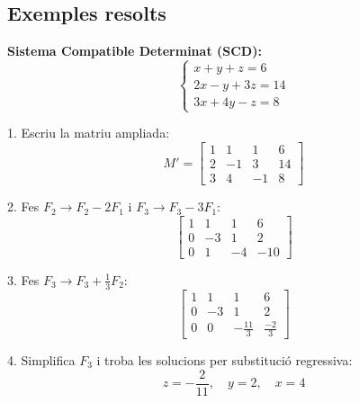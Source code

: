 \documentclass[12pt]{article}
\begin{document}
\subsection*{Exemples resolts}
\begin{exemple}
\textbf{Sistema Compatible Determinat (SCD):}
\[
\begin{cases}
x + y + z = 6 \\
2x - y + 3z = 14 \\
3x + 4y - z = 8
\end{cases}
\]

1. Escriu la matriu ampliada:
\[
M' =
\begin{bmatrix}
1 & 1 & 1 & 6 \\
2 & -1 & 3 & 14 \\
3 & 4 & -1 & 8
\end{bmatrix}
\]

2. Fes \(F_2 \to F_2 - 2F_1\) i \(F_3 \to F_3 - 3F_1\):
\[
\begin{bmatrix}
1 & 1 & 1 & 6 \\
0 & -3 & 1 & 2 \\
0 & 1 & -4 & -10
\end{bmatrix}
\]

3. Fes \(F_3 \to F_3 + \frac{1}{3}F_2\):
\[
\begin{bmatrix}
1 & 1 & 1 & 6 \\
0 & -3 & 1 & 2 \\
0 & 0 & -\frac{11}{3} & \frac{-2}{3}
\end{bmatrix}
\]

4. Simplifica \(F_3\) i troba les solucions per substitució regressiva:
\[
z = -\frac{2}{11}, \quad y = 2, \quad x = 4
\]
\end{exemple}
\end{document}
